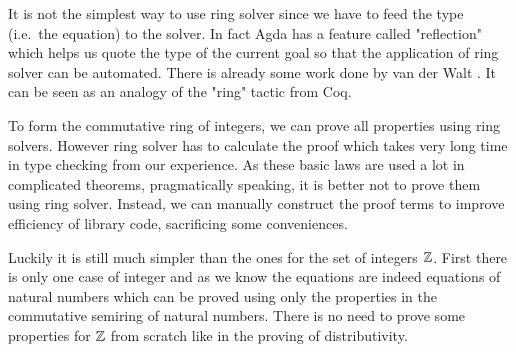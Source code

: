It is not the simplest way to use ring solver since we have to feed
the type (i.e.\ the equation) to the solver. In fact Agda has a feature called "reflection" which helps us quote the type of the current goal so that the application of ring solver can be automated. There is already some work
done by van der Walt \cite{van2012reflection}. It can be seen as an
analogy of the "ring" tactic from Coq.

To form the commutative ring of integers, we can prove all properties using ring solvers. However ring solver has to calculate the proof which takes very long time in type checking from our experience. As
these basic laws are used a lot in complicated theorems, pragmatically speaking, it is better not to prove them using ring solver.
Instead, we can manually construct the proof terms to improve efficiency of library
code, sacrificing some conveniences.

Luckily it is still much simpler than the ones for the set of integers $\mathbb{Z}$.
First there is only one case of integer and as we know the equations are
indeed equations of natural numbers which can be proved using only the
properties in the commutative semiring of natural numbers. There is no
need to prove some properties for $\mathbb{Z}$ from scratch like in the
proving of distributivity.


